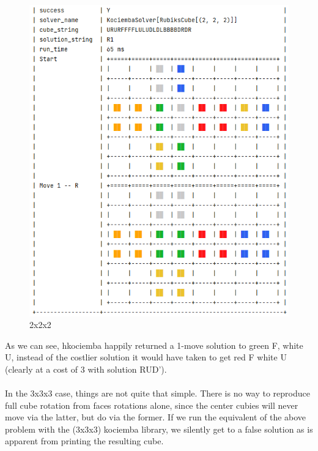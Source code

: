 \begin{figure}[H]
\centering
\includegraphics[scale=0.6]{./Figures/KociembaBug222}
\caption[Kociemba Bug]{2x2x2}
\label{fig:KociembaBug222}
\end{figure}
As we can see, hkociemba happily returned a 1-move solution to green F, white U, instead of the costlier solution it would have taken to get red F white U (clearly at a cost of 3 with solution RUD').
\\
\\
In the 3x3x3 case, things are not quite that simple. There is no way to reproduce full cube rotation from faces rotations alone, since the center cubies will never move via the latter, but do via the former. If we run the equivalent of the above problem with the (3x3x3) kociemba library, we silently get to a false solution as is apparent from printing the resulting cube.
\afblue
